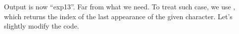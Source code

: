 Output is now ``exp13''. Far from what we need. To treat such case, we use , which returns the index of the last appearance of the given character. Let's slightly modify the code.